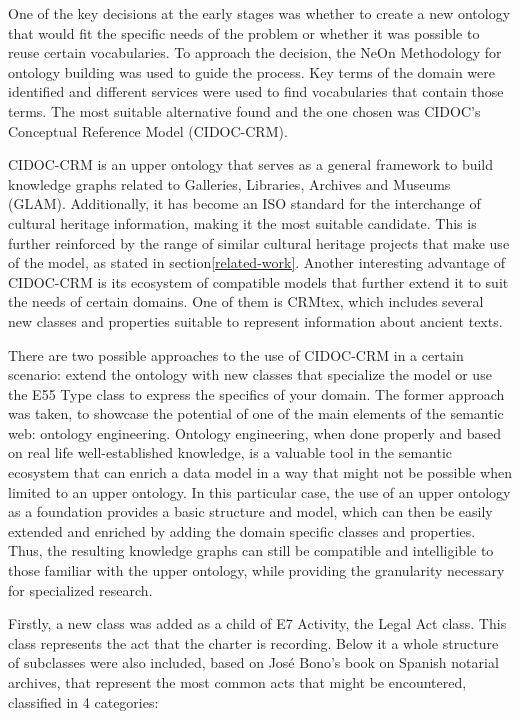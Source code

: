 \documentclass{article}
\begin{document}
One of the key decisions at the early stages was whether to create a new ontology that would fit the specific needs of the problem or whether it was possible to reuse certain vocabularies.
To approach the decision, the NeOn Methodology for ontology building\cite{suarez-figueroa_neon_2010} was used to guide the process.
Key terms of the domain were identified and different services were used to find vocabularies that contain those terms.
The most suitable alternative found and the one chosen was CIDOC's Conceptual Reference Model (CIDOC-CRM).

CIDOC-CRM is an upper ontology that serves as a general framework to build knowledge graphs related to Galleries, Libraries, Archives and Museums (GLAM)\cite{biagetti_cidoc_2016}.
Additionally, it has become an ISO standard for the interchange of cultural heritage information\cite{noauthor_iso_nodate}, making it the most suitable candidate.
This is further reinforced by the range of similar cultural heritage projects that make use of the model, as stated in section\ref{related-work}.
Another interesting advantage of CIDOC-CRM is its ecosystem of compatible models that further extend it to suit the needs of certain domains.
One of them is CRMtex, which includes several new classes and properties suitable to represent information about ancient texts\cite{doerr2020crmtex}.

There are two possible approaches to the use of CIDOC-CRM in a certain scenario: extend the ontology with new classes that specialize the model or use the E55 Type class to express the specifics of your domain.
The former approach was taken, to showcase the potential of one of the main elements of the semantic web: ontology engineering.
Ontology engineering, when done properly and based on real life well-established knowledge, is a valuable tool in the semantic ecosystem that can enrich a data model in a way that might not be possible when limited to an upper ontology.
In this particular case, the use of an upper ontology as a foundation provides a basic structure and model, which can then be easily extended and enriched by adding the domain specific classes and properties.
Thus, the resulting knowledge graphs can still be compatible and intelligible to those familiar with the upper ontology, while providing the granularity necessary for specialized research.

Firstly, a new class was added as a child of E7 Activity, the Legal Act class.
This class represents the act that the charter is recording.
Below it a whole structure of subclasses were also included, based on José Bono's book on Spanish notarial archives\cite{huerta_archivos_1985}, that represent the most common acts that might be encountered, classified in 4 categories: 
\end{document}
